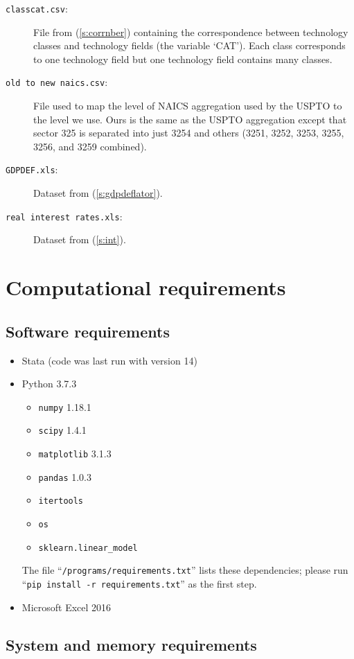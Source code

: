 \documentclass[a4paper,11pt]{article}
\begin{document}
\begin{description}
  \item[\texttt{classcat.csv}:] File from (\ref{s:corrnber}) containing the correspondence between technology classes and technology fields (the variable `CAT'). Each class corresponds to one technology field but one technology field contains many classes.
  \item[\texttt{old to new naics.csv}:] File used to map the level of NAICS aggregation used by the USPTO to the level we use. Ours is the same as the USPTO aggregation except that sector 325 is separated into just 3254 and others (3251, 3252, 3253, 3255, 3256, and 3259 combined).
  \item[\texttt{GDPDEF.xls}:] Dataset from (\ref{s:gdpdeflator}).
  \item[\texttt{real interest rates.xls}:] Dataset from (\ref{s:int}).
\end{description}


\section{Computational requirements}

\subsection{Software requirements}

\begin{itemize}
\item Stata (code was last run with version 14)
\item Python 3.7.3
  \begin{itemize}
  \item \texttt{numpy} 1.18.1
  \item \texttt{scipy} 1.4.1
  \item \texttt{matplotlib} 3.1.3
  \item \texttt{pandas} 1.0.3
  \item \texttt{itertools}
  \item \texttt{os}
  \item \texttt{sklearn.linear_model}
  \end{itemize}
  The file ``\texttt{/programs/requirements.txt}'' lists these dependencies;
    please run ``\texttt{pip install -r requirements.txt}'' as the
    first step.
\item Microsoft Excel 2016
\end{itemize}

\subsection{System and memory requirements}
\end{document}

